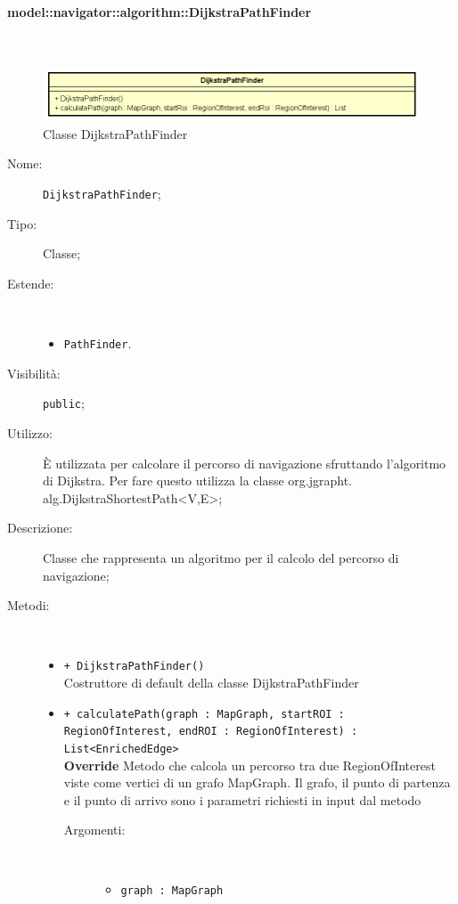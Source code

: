 \documentclass[../DefinizioneDiProdotto.tex]{subfiles}
\begin{document}
\paragraph{model::navigator::algorithm::DijkstraPathFinder}
\
\begin{figure}[H]
	\centering
	\includegraphics[width=\maxwidth]{img/DijkstraPathFinder.png}
	\caption{Classe DijkstraPathFinder}\label{fig:model::navigator::algorithm::DijkstraPathFinder} 
\end{figure}
\begin{description}
	\item[Nome:] \texttt{DijkstraPathFinder};
	\item[Tipo:] Classe;
	\item[Estende:] \
	\begin{itemize}
		\item \texttt{PathFinder}.
	\end{itemize}
	\item[Visibilità:] \texttt{public};
	\item[Utilizzo:] È utilizzata per calcolare il percorso di navigazione sfruttando l'algoritmo di Dijkstra. Per fare questo utilizza la classe org.jgrapht.\\alg.DijkstraShortestPath<V,E>;
	\item[Descrizione:] Classe che rappresenta un algoritmo per il calcolo del percorso di navigazione;
	\item[Metodi:] \
	\begin{itemize}
		\item \texttt{+ DijkstraPathFinder()}\\
		Costruttore di default della classe DijkstraPathFinder
		\item \texttt{+ calculatePath(graph : MapGraph, startROI : RegionOfInterest, endROI : RegionOfInterest) : List<EnrichedEdge>}\\
		\textbf{Override} Metodo che calcola un percorso tra due RegionOfInterest viste come vertici di un grafo MapGraph. Il grafo, il punto di partenza e il punto di arrivo sono i parametri richiesti in input dal metodo
		\begin{description}
			\item[Argomenti:] \
			\begin{itemize}
				\item \texttt{graph : MapGraph}\\

\end{itemize}
\end{description}
\end{itemize}
\end{description}
\end{document}
